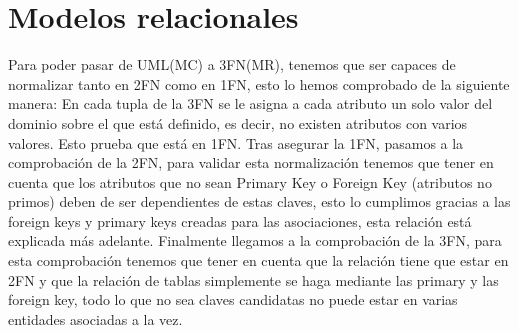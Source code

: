 \begin{table}[H]
	\centering
	\caption{\textbf{Requisitos Funcionales}}
\end{table}

\section{Modelos relacionales}
Para poder pasar de UML(MC) a 3FN(MR), tenemos que ser capaces de normalizar tanto en 2FN como en 1FN,
esto lo hemos comprobado de la siguiente manera:
En cada tupla de la 3FN se le asigna a cada atributo un solo valor del dominio sobre el que está definido, es decir, no existen atributos con
varios valores. Esto prueba que está en 1FN.
Tras asegurar la 1FN, pasamos a la comprobación de la 2FN, para validar esta normalización tenemos que tener en cuenta que los atributos que no
sean Primary Key o Foreign Key (atributos no primos) deben de ser dependientes de estas claves, esto lo cumplimos gracias a las foreign keys y
primary keys creadas para las asociaciones, esta relación está explicada más adelante.
Finalmente llegamos a la comprobación de la 3FN, para esta comprobación tenemos que tener en cuenta que la relación tiene que estar en 2FN y que
la relación de tablas simplemente se haga mediante las primary y las foreign key, todo lo que no sea claves candidatas no puede estar en
varias entidades asociadas a la vez.

